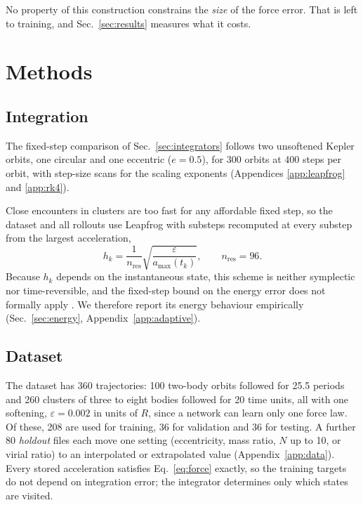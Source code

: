 \documentclass[a4paper,journal]{IEEEtran}
\begin{document}
No property of this construction constrains the \emph{size} of the force error. That is left to training, and Sec.~\ref{sec:results} measures what it costs.

\section{Methods}\label{sec:methods}

\subsection{Integration}\label{sec:integration}

The fixed-step comparison of Sec.~\ref{sec:integrators} follows two unsoftened Kepler orbits, one circular and one eccentric ($e=0.5$), for 300 orbits at 400 steps per orbit, with step-size scans for the scaling exponents (Appendices \ref{app:leapfrog} and \ref{app:rk4}).

Close encounters in clusters are too fast for any affordable fixed step, so the dataset and all rollouts use Leapfrog with substeps recomputed at every substep from the largest acceleration,
\begin{equation}
h_k=\frac{1}{n_\mathrm{res}}\sqrt{\frac{\varepsilon}{a_{\max}(t_k)}},\qquad n_\mathrm{res}=96 .
\label{eq:substep}
\end{equation}
Because $h_k$ depends on the instantaneous state, this scheme is neither symplectic nor time-reversible, and the fixed-step bound on the energy error does not formally apply \cite{Hut1995}. We therefore report its energy behaviour empirically (Sec.~\ref{sec:energy}, Appendix~\ref{app:adaptive}).

\subsection{Dataset}\label{sec:data}

The dataset has 360 trajectories: 100 two-body orbits followed for 25.5 periods and 260 clusters of three to eight bodies followed for 20 time units, all with one softening, $\varepsilon=0.002$ in units of $R$, since a network can learn only one force law. Of these, 208 are used for training, 36 for validation and 36 for testing. A further 80 \emph{holdout} files each move one setting (eccentricity, mass ratio, $N$ up to 10, or virial ratio) to an interpolated or extrapolated value (Appendix~\ref{app:data}). Every stored acceleration satisfies Eq.~\eqref{eq:force} exactly, so the training targets do not depend on integration error; the integrator determines only which states are visited.
\end{document}
